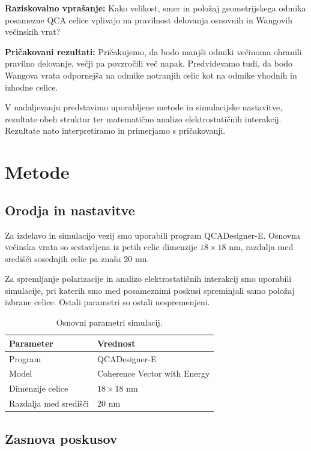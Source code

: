 \documentclass[12pt,a4paper]{article}
\begin{document}
\textbf{Raziskovalno vprašanje: }Kako velikost, smer in položaj geometrijskega odmika posamezne QCA celice vplivajo na pravilnost delovanja osnovnih in Wangovih večinskih vrat?

\textbf{Pričakovani rezultati: }Pričakujemo, da bodo manjši odmiki večinoma ohranili pravilno delovanje, večji pa povzročili več napak.
Predvidevamo tudi, da bodo Wangova vrata odpornejša na odmike notranjih celic kot na odmike vhodnih in izhodne celice.

V nadaljevanju predstavimo uporabljene metode in simulacijske nastavitve, rezultate obeh struktur ter matematično analizo
elektrostatičnih interakcij. Rezultate nato interpretiramo in primerjamo s pričakovanji.


\section{Metode}
\label{g18:sec:metode}

\subsection{Orodja in nastavitve}
\label{g18:sec:orodja}

Za izdelavo in simulacijo vezij smo uporabili program QCADesigner-E. Osnovna večinska vrata so sestavljena
iz petih celic dimenzije $18 \times 18$ nm, razdalja med središči sosednjih celic pa znaša 20 nm.

Za spremljanje polarizacije in analizo elektrostatičnih interakcij smo uporabili simulacije, pri katerih smo
med posameznimi poskusi spreminjali samo položaj izbrane celice. Ostali parametri so ostali nespremenjeni.

\begin{table}[htbp]
    \caption{Osnovni parametri simulacij.}
    \label{g18:tab:parametri}
    \centering
    \begin{tabular}{ll}
        \toprule
        Parameter & Vrednost \\
        \midrule
        Program & QCADesigner-E \\
        Model & Coherence Vector with Energy \\
        Dimenzije celice & $18 \times 18$ nm \\
        Razdalja med središči & 20 nm \\
        \bottomrule
    \end{tabular}
\end{table}


\subsection{Zasnova poskusov}
\label{g18:sec:poskusi}
\end{document}

